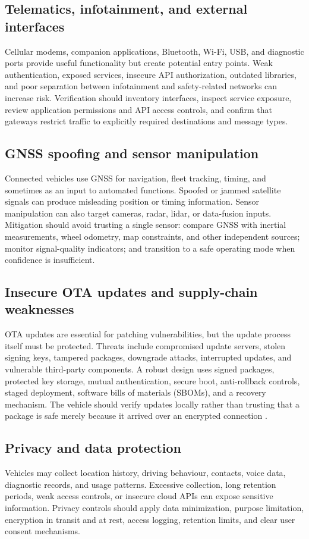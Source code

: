 \documentclass[11pt]{article}
\begin{document}
\subsection{Telematics, infotainment, and external interfaces}
Cellular modems, companion applications, Bluetooth, Wi-Fi, USB, and diagnostic ports provide useful functionality but create potential entry points. Weak authentication, exposed services, insecure API authorization, outdated libraries, and poor separation between infotainment and safety-related networks can increase risk. Verification should inventory interfaces, inspect service exposure, review application permissions and API access controls, and confirm that gateways restrict traffic to explicitly required destinations and message types.

\subsection{GNSS spoofing and sensor manipulation}
Connected vehicles use GNSS for navigation, fleet tracking, timing, and sometimes as an input to automated functions. Spoofed or jammed satellite signals can produce misleading position or timing information. Sensor manipulation can also target cameras, radar, lidar, or data-fusion inputs. Mitigation should avoid trusting a single sensor: compare GNSS with inertial measurements, wheel odometry, map constraints, and other independent sources; monitor signal-quality indicators; and transition to a safe operating mode when confidence is insufficient.

\subsection{Insecure OTA updates and supply-chain weaknesses}
OTA updates are essential for patching vulnerabilities, but the update process itself must be protected. Threats include compromised update servers, stolen signing keys, tampered packages, downgrade attacks, interrupted updates, and vulnerable third-party components. A robust design uses signed packages, protected key storage, mutual authentication, secure boot, anti-rollback controls, staged deployment, software bills of materials (SBOMs), and a recovery mechanism. The vehicle should verify updates locally rather than trusting that a package is safe merely because it arrived over an encrypted connection \cite{li2024ota}.

\subsection{Privacy and data protection}
Vehicles may collect location history, driving behaviour, contacts, voice data, diagnostic records, and usage patterns. Excessive collection, long retention periods, weak access controls, or insecure cloud APIs can expose sensitive information. Privacy controls should apply data minimization, purpose limitation, encryption in transit and at rest, access logging, retention limits, and clear user consent mechanisms.
\end{document}

